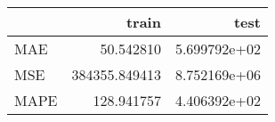 \begin{tabular}{lrr}
\toprule
{} &          train &          test \\
\midrule
MAE  &      50.542810 &  5.699792e+02 \\
MSE  &  384355.849413 &  8.752169e+06 \\
MAPE &     128.941757 &  4.406392e+02 \\
\bottomrule
\end{tabular}
